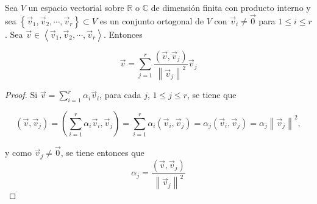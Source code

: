 \begin{theorem}

Sea $V$ un espacio vectorial sobre $\mathbb{R}$ o $\mathbb{C}$ de dimensión finita con producto interno y sea $\left\{\vec{v}_1,\vec{v}_2,\cdots, \vec{v}_r\right\}\subset V$ es un conjunto ortogonal de $V$ con $\vec{v}_i\neq \vec{0}$  para  $1\leq i\leq r$. Sea $\vec{v} \in \left\langle \vec{v}_1,\vec{v}_2,\cdots, \vec{v}_r\right\rangle$. Entonces 


\begin{equation}
  \vec{v} =\sum^{r}_{j=1}   \frac {(\vec{v}, \vec{v}_j)} {\left\|\vec{v}_j\right\|^{2}} \vec{v}_j
  \label{50}
\end{equation}


\begin{proof}
 Si  $ \vec{v} = \sum_{i=1}^r  \alpha_i \vec{v}_i$, para cada $j$, $ 1 \leq j \leq r$, se tiene que 

 $$ (\vec{v}, \vec{v}_j)= ( \sum_{i=1}^r  \alpha_i \vec{v}_i,\vec{v}_j) = \sum_{i=1}^r  \alpha_i (\vec{v}_i,\vec{v}_j )= \alpha_j (\vec{v}_i,\vec{v}_j ) =\alpha_j \left\|\vec{v}_j\right\|^{2}, $$

\noindent 
 y como $\vec{v}_j\neq \vec{0}$, se tiene entonces que \[\alpha_j = \frac{(\vec{v}, \vec{v}_j)}{\left\|\vec{v}_j\right\|^{2}}\]
\end{proof}

\end{theorem}

\bigskip


